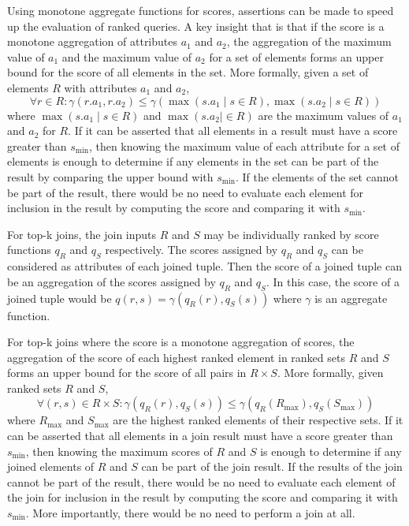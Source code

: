 Using monotone aggregate functions for scores, assertions can be made to speed up the evaluation of ranked queries. A key insight that is that if the score is a monotone aggregation of attributes \(a_1\) and \(a_2\), the aggregation of the maximum value of \(a_1\) and the maximum value of \(a_2\) for a set of elements forms an upper bound for the score of all elements in the set. More formally, given a set of elements \(R\) with attributes \(a_1\) and \(a_2\),
\[
  \forall r \in R :
  \gamma(r.a_1, r.a_2)
  \leq
  \gamma(\max(s.a_1 \mid s \in R), \max(s.a_2 \mid s \in R))
\]
where \(\max(s.a_1 \mid s \in R)\) and \(\max(s.a_2 \mid \in R)\) are the maximum values of \(a_1\) and \(a_2\) for \(R\). If it can be asserted that all elements in a result must have a score greater than \(s_{\min}\), then knowing the maximum value of each attribute for a set of elements is enough to determine if any elements in the set can be part of the result by comparing the upper bound with \(s_{\min}\). If the elements of the set cannot be part of the result, there would be no need to evaluate each element for inclusion in the result by computing the score and comparing it with \(s_{\min}\).

For top-k joins, the join inputs \(R\) and \(S\) may be individually ranked by score functions \(q_R\) and \(q_S\) respectively. The scores assigned by \(q_R\) and \(q_S\) can be considered as attributes of each joined tuple. Then the score of a joined tuple can be an aggregation of the scores assigned by \(q_R\) and \(q_S\). In this case, the score of a joined tuple would be \(q(r, s) = \gamma(q_R(r), q_S(s))\) where \(\gamma\) is an aggregate function.

For top-k joins where the score is a monotone aggregation of scores, the aggregation of the score of each highest ranked element in ranked sets \(R\) and \(S\) forms an upper bound for the score of all pairs in \(R \times S\). More formally, given ranked sets \(R\) and \(S\),
\[
  \forall (r, s) \in R \times S :
  \gamma(q_R(r), q_S(s))
  \leq
  \gamma(q_R(R_{\max}), q_S(S_{\max}))
\]
where \(R_{\max}\) and \(S_{\max}\) are the highest ranked elements of their respective sets. If it can be asserted that all elements in a join result must have a score greater than \(s_{\min}\), then knowing the maximum scores of \(R\) and \(S\) is enough to determine if any joined elements of \(R\) and \(S\) can be part of the join result. If the results of the join cannot be part of the result, there would be no need to evaluate each element of the join for inclusion in the result by computing the score and comparing it with \(s_{\min}\). More importantly, there would be no need to perform a join at all.

